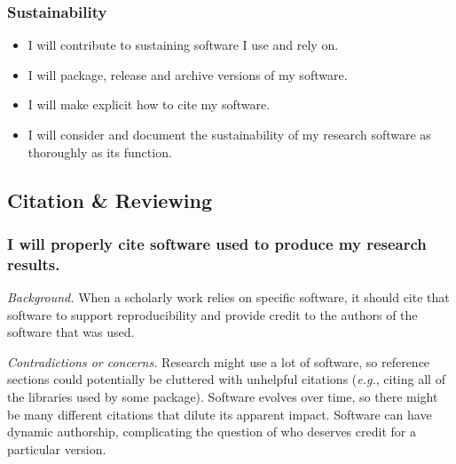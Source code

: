 \documentclass[a4paper,UKenglish]{dagman}
\renewcommand{\paragraph}[1]{\subsubsection*{#1}\xspace}
\newcommand{\eg}{\emph{e.g.},\xspace}
\begin{document}
\paragraph{Sustainability}
\begin{itemize}
\item I will contribute to sustaining software I use and rely on. 
\item I will package, release and archive versions of my software.
\item I will make explicit how to cite my software.
\item I will consider and document the sustainability of my research software as thoroughly as its function.
\end{itemize}


\subsection{Citation \& Reviewing}



\paragraph{I will properly cite software used to produce my research results.}

\emph{Background.} When a scholarly work relies on specific software, it should cite that software to support reproducibility and provide credit to the authors of the software that was used.

\emph{Contradictions or concerns.}
Research might use a lot of software, so reference sections could potentially be cluttered with unhelpful citations (\eg citing all of the libraries used by some package). 
Software evolves over time, so there might be many different citations that dilute its apparent impact. 
Software can have dynamic authorship, complicating the question of who deserves credit for a particular version. 
\end{document}
